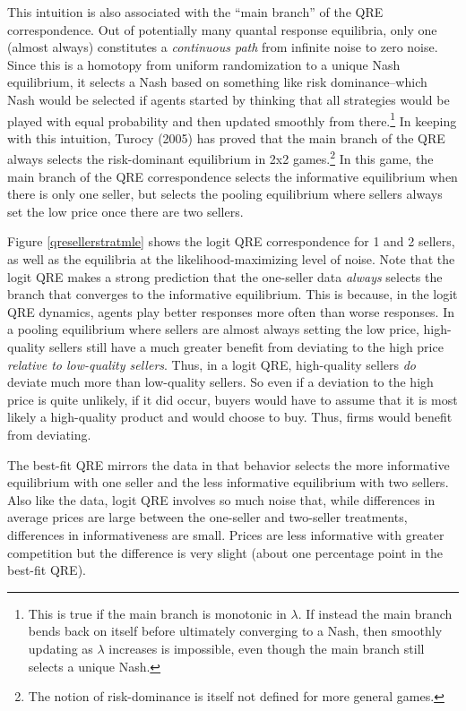 \documentclass[12pt]{article}
\begin{document}
This intuition is also associated with the ``main branch'' of the QRE correspondence. Out of potentially many quantal response equilibria, only one (almost always) constitutes a \emph{continuous path} from infinite noise to zero noise. Since this is a homotopy from uniform randomization to a unique Nash equilibrium, it selects a Nash based on something like risk dominance--which Nash would be selected if agents started by thinking that all strategies would be played with equal probability and then updated smoothly from there.\footnote{This is true if the main branch is monotonic in $\lambda$. If instead the main branch bends back on itself before ultimately converging to a Nash, then smoothly updating as $\lambda$ increases is impossible, even though the main branch still selects a unique Nash.} In keeping with this intuition, Turocy (2005) has proved that the main branch of the QRE always selects the risk-dominant equilibrium in 2x2 games.\footnote{The notion of risk-dominance is itself not defined for more general games.} In this game, the main branch of the QRE correspondence selects the informative equilibrium when there is only one seller, but selects the pooling equilibrium where sellers always set the low price once there are two sellers.

Figure \ref{qresellerstratmle} shows the logit QRE correspondence for 1 and 2 sellers, as well as the equilibria at the likelihood-maximizing level of noise. Note that the logit QRE makes a strong prediction that the one-seller data \emph{always} selects the branch that converges to the informative equilibrium. This is because, in the logit QRE dynamics, agents play better responses more often than worse responses. In a pooling equilibrium where sellers are almost always setting the low price, high-quality sellers still have a much greater benefit from deviating to the high price \emph{relative to low-quality sellers}. Thus, in a logit QRE, high-quality sellers \emph{do} deviate much more than low-quality sellers. So even if a deviation to the high price is quite unlikely, if it did occur, buyers would have to assume that it is most likely a high-quality product and would choose to buy. Thus, firms would benefit from deviating.



The best-fit QRE mirrors the data in that behavior selects the more informative equilibrium with one seller and the less informative equilibrium with two sellers. Also like the data, logit QRE involves so much noise that, while differences in average prices are large between the one-seller and two-seller treatments, differences in informativeness are small. Prices are less informative with greater competition but the difference is very slight (about one percentage point in the best-fit QRE). 
\end{document}

